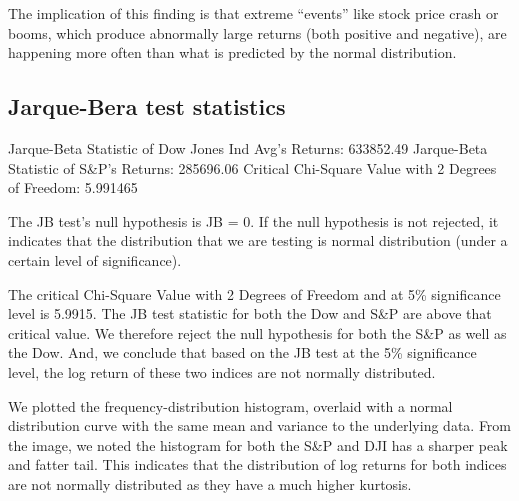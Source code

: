 \documentclass[a4paper]{article}
\begin{document}
	The implication of this finding is that extreme “events” like stock price crash or booms, which produce abnormally large returns (both positive and negative), are happening more often than what is predicted by the normal distribution.
	
	
	\subsection{Jarque-Bera test statistics}
	\begin{flushleft}
		Jarque-Beta Statistic of Dow Jones Ind Avg's Returns: 633852.49\linebreak
		Jarque-Beta Statistic of S\&P's Returns: 285696.06\linebreak
		Critical Chi-Square Value with 2 Degrees of Freedom: 5.991465\linebreak
	\end{flushleft}
	\vspace{-7mm}
	The JB test’s null hypothesis is JB = 0. If the null hypothesis is not rejected, it indicates that the distribution that we are testing is normal distribution (under a certain level of significance).  
	
	The critical Chi-Square Value with 2 Degrees of Freedom and at 5\% significance level is 5.9915. The JB test statistic for both the Dow and S\&P are above that critical value. We therefore reject the null hypothesis for both the S\&P as well as the Dow. And, we conclude that based on the JB test at the 5\% significance level, the log return of these two indices are not normally distributed.
	
	We plotted the frequency-distribution histogram, overlaid with a normal distribution curve with the same mean and variance to the underlying data. From the image, we noted the histogram for both the S\&P and DJI has a sharper peak and fatter tail. This indicates that the distribution of log returns for both indices are not normally distributed as they have a much higher kurtosis.
	
\end{document}
